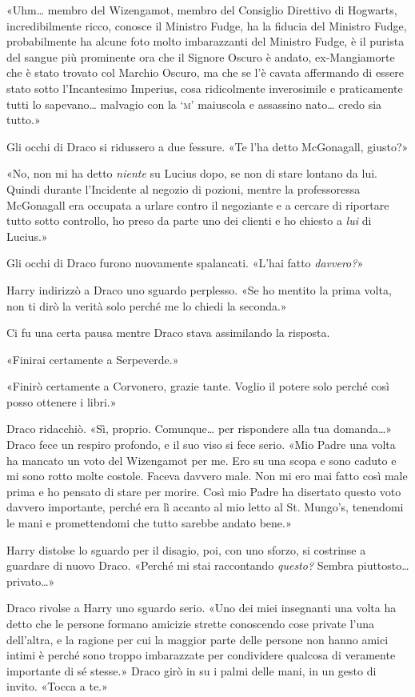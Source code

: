 «Uhm… membro del Wizengamot, membro del Consiglio Direttivo di Hogwarts, incredibilmente ricco, conosce il Ministro Fudge, ha la fiducia del Ministro Fudge, probabilmente ha alcune foto molto imbarazzanti del Ministro Fudge, è il purista del sangue più prominente ora che il Signore Oscuro è andato, ex-Mangiamorte che è stato trovato col Marchio Oscuro, ma che se l’è cavata affermando di essere stato sotto l’Incantesimo Imperius, cosa ridicolmente inverosimile e praticamente tutti lo sapevano… malvagio con la ‘\textsc{m}’ maiuscola e assassino nato… credo sia tutto.»

Gli occhi di Draco si ridussero a due fessure. «Te l’ha detto McGonagall, giusto?»

«No, non mi ha detto \textit{niente} su Lucius dopo, se non di stare lontano da lui. Quindi durante l’Incidente al negozio di pozioni, mentre la professoressa McGonagall era occupata a urlare contro il negoziante e a cercare di riportare tutto sotto controllo, ho preso da parte uno dei clienti e ho chiesto a \textit{lui} di Lucius.»

Gli occhi di Draco furono nuovamente spalancati. «L’hai fatto \textit{davvero?}»

Harry indirizzò a Draco uno sguardo perplesso. «Se ho mentito la prima volta, non ti dirò la verità solo perché me lo chiedi la seconda.»

Ci fu una certa pausa mentre Draco stava assimilando la risposta.

«Finirai certamente a Serpeverde.»

«Finirò certamente a Corvonero, grazie tante. Voglio il potere solo perché così posso ottenere i libri.»

Draco ridacchiò. «Sì, proprio. Comunque… per rispondere alla tua domanda…» Draco fece un respiro profondo, e il suo viso si fece serio. «Mio Padre una volta ha mancato un voto del Wizengamot per me. Ero su una scopa e sono caduto e mi sono rotto molte costole. Faceva davvero male. Non mi ero mai fatto così male prima e ho pensato di stare per morire. Così mio Padre ha disertato questo voto davvero importante, perché era lì accanto al mio letto al St. Mungo’s, tenendomi le mani e promettendomi che tutto sarebbe andato bene.»

Harry distolse lo sguardo per il disagio, poi, con uno sforzo, si costrinse a guardare di nuovo Draco. «Perché mi stai raccontando \textit{questo?} Sembra piuttosto… privato…»

Draco rivolse a Harry uno sguardo serio. «Uno dei miei insegnanti una volta ha detto che le persone formano amicizie strette conoscendo cose private l’una dell’altra, e la ragione per cui la maggior parte delle persone non hanno amici intimi è perché sono troppo imbarazzate per condividere qualcosa di veramente importante di sé stesse.» Draco girò in su i palmi delle mani, in un gesto di invito. «Tocca a te.»

